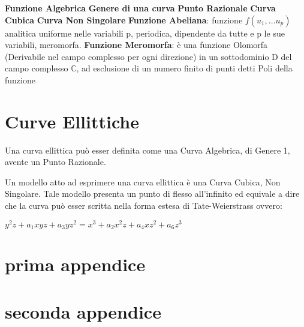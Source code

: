 \documentclass[a4paper,12pt]{tesiinfo}
\begin{document}
\newline\newline
\textbf{Funzione Algebrica}
\newline\newline
\textbf{Genere di una curva}
\newline\newline
\textbf{Punto Razionale}
\newline\newline
\textbf{Curva Cubica}
\newline\newline
\textbf{Curva Non Singolare}
\newline\newline
\textbf{Funzione Abeliana}: funzione $f(u_1, ... u_p)$ analitica uniforme nelle variabili p, periodica, dipendente da tutte e p le sue variabili, meromorfa.\newline\newline
\textbf{Funzione Meromorfa}: \`e una funzione Olomorfa (Derivabile nel campo complesso per ogni direzione) in un sottodominio D del campo complesso $\mathbb{C}$, ad esclusione di un numero finito di punti detti Poli della funzione\newline\newline
















\chapter{Curve Ellittiche}

Una curva ellittica pu\`o esser definita come una Curva Algebrica, di Genere 1, avente un Punto Razionale.

Un modello atto ad esprimere una curva ellittica \`e una Curva Cubica, Non Singolare. Tale modello presenta un punto di flesso all'infinito ed equivale a dire che la curva pu\`o esser scritta nella forma estesa di Tate-Weierstrass ovvero:

$y^{2}z + a_1xyz + a_3yz^2 =x^3 + a_2x^2z + a_4xz^2 + a_6z^3$




\appendice
\chapter{prima appendice}
\chapter{seconda appendice}
\end{document}
